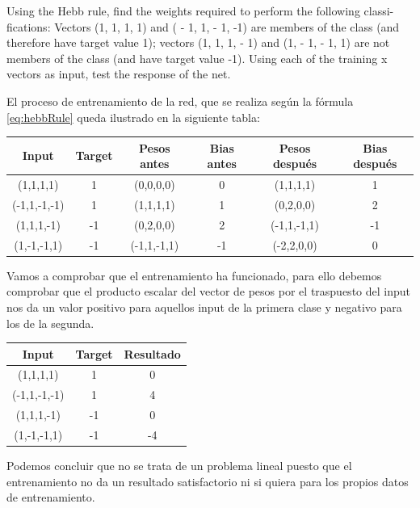 \begin{problem}[5]
\ppart Using the Hebb rule, find the weights required to perform the following classi-
fications: Vectors (1, 1, 1, 1) and ( - 1, 1, - 1, -1) are members of the class (and
therefore have target value 1); vectors (1, 1, 1, - 1) and (1, - 1, - 1, 1) are not
members of the class (and have target value -1).
\ppart Using each of the training x vectors as input, test the response of the net.
\solution

\spart
El proceso de entrenamiento de la red, que se realiza según la fórmula \ref{eq:hebbRule} queda ilustrado en la siguiente tabla:

\begin{center}
\begin{tabular}{|c|c|c|c|c|c|}
\hline
\textbf{Input} & \textbf{Target} & \textbf{Pesos antes} & \textbf{Bias antes} & \textbf{Pesos después} & \textbf{Bias después} \\
\hline
(1,1,1,1)    & 1  & (0,0,0,0) & 0 & (1,1,1,1) & 1\\
(-1,1,-1,-1) & 1  & (1,1,1,1) & 1 & (0,2,0,0) & 2\\
(1,1,1,-1)   & -1 & (0,2,0,0) & 2 & (-1,1,-1,1) & -1\\
(1,-1,-1,1)  & -1 & (-1,1,-1,1) & -1 & (-2,2,0,0) & 0\\
\hline
\end{tabular}
\end{center}

\spart
Vamos a comprobar que el entrenamiento ha funcionado, para ello debemos comprobar que el producto escalar del vector de pesos por el traspuesto del input nos da un valor positivo para aquellos input de la primera clase y negativo para los de la segunda.

\begin{center}
\begin{tabular}{|c|c|c|}
\hline
\textbf{Input} & \textbf{Target} & \textbf{Resultado} \\
\hline
(1,1,1,1)    & 1  & 0 \\
(-1,1,-1,-1) & 1  & 4 \\
(1,1,1,-1)   & -1 & 0 \\
(1,-1,-1,1)  & -1 & -4 \\
\hline
\end{tabular}
\end{center}

Podemos concluir que no se trata de un problema lineal puesto que el entrenamiento no da un resultado satisfactorio ni si quiera para los propios datos de entrenamiento.

\end{problem}

